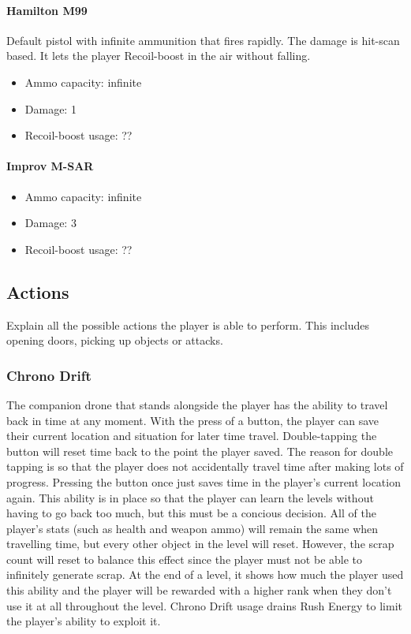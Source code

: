 \documentclass[12pt]{article}
\begin{document}
\paragraph{Hamilton M99} 

Default pistol with infinite ammunition that fires rapidly. The damage is hit-scan based. It lets the player Recoil-boost in the air without falling.

\begin{itemize}
	\item Ammo capacity: infinite
	\item Damage: 1
	\item Recoil-boost usage: ??
\end{itemize}

\paragraph{Improv M-SAR} 

\begin{itemize}
	\item Ammo capacity: infinite
	\item Damage: 3
	\item Recoil-boost usage: ??
\end{itemize}

\subsection{Actions}

Explain all the possible actions the player is able to perform. This includes opening doors, picking up objects or attacks.

\subsubsection{Chrono Drift}

The companion drone that stands alongside the player has the ability to travel back in time at any moment. With the press of a button, the player can save their current location and situation for later time travel. Double-tapping the button will reset time back to the point the player saved. The reason for double tapping is so that the player does not accidentally travel time after making lots of progress. Pressing the button once just saves time in the player's current location again. This ability is in place so that the player can learn the levels without having to go back too much, but this must be a concious decision. All of the player's stats (such as health and weapon ammo) will remain the same when travelling time, but every other object in the level will reset. However, the scrap count will reset to balance this effect since the player must not be able to infinitely generate scrap. At the end of a level, it shows how much the player used this ability and the player will be rewarded with a higher rank when they don't use it at all throughout the level. Chrono Drift usage drains Rush Energy to limit the player's ability to exploit it.
\end{document}
